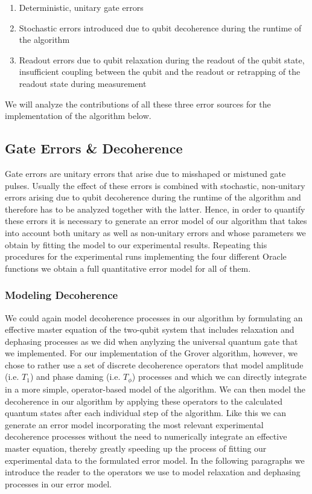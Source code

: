 \begin{enumerate}
	\item Deterministic, unitary gate errors
	\item Stochastic errors introduced due to qubit decoherence during the runtime of the algorithm
	\item Readout errors due to qubit relaxation during the readout of the qubit state, insufficient coupling between the qubit and the readout or retrapping of the readout state during measurement
\end{enumerate}

We will analyze the contributions of all these three error sources for the implementation of the algorithm below.
\subsection{Gate Errors \& Decoherence}

Gate errors are unitary errors that arise due to misshaped or mistuned gate pulses. Usually the effect of these errors is combined with stochastic, non-unitary errors arising due to qubit decoherence during the runtime of the algorithm and therefore has to be analyzed together with the latter. Hence, in order to quantify these errors it is necessary to generate an error model of our algorithm that takes into account both unitary as well as non-unitary errors and whose parameters we obtain by fitting the model to our experimental results. Repeating this procedures for the experimental runs implementing the four different Oracle functions we obtain a full quantitative error model for all of them.

\subsubsection{Modeling Decoherence}

We could again model decoherence processes in our algorithm by formulating an effective master equation of the two-qubit system that includes relaxation and dephasing processes as we did when anylyzing the universal quantum gate that we implemented. For our implementation of the Grover algorithm, however, we chose to rather use a set of discrete decoherence operators that model amplitude (i.e. $T_1$) and phase daming (i.e. $T_\phi$) processes and which we can directly integrate in a more simple, operator-based model of the algorithm. We can then model the decoherence in our algorithm by applying these operators to the calculated quantum states after each individual step of the algorithm. Like this we can generate an error model incorporating the most relevant experimental decoherence processes without the need to numerically integrate an effective master equation, thereby greatly speeding up the process of fitting our experimental data to the formulated error model. In the following paragraphs we introduce the reader to the operators we use to model relaxation and dephasing processes in our error model.

